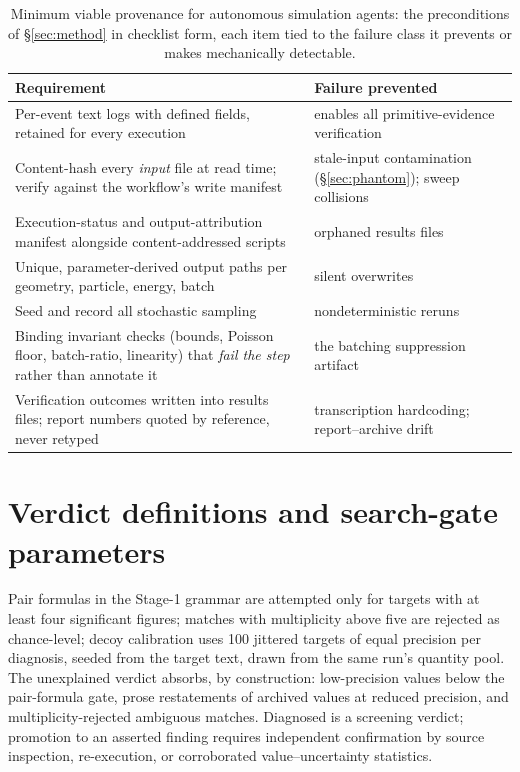 \documentclass{article}
\begin{document}
\begin{table}[H]
\centering
\small
\caption{Minimum viable provenance for autonomous simulation agents: the preconditions of \S\ref{sec:method} in checklist form, each item tied to the failure class it prevents or makes mechanically detectable.}
\label{tab:checklist}
\begin{tabular}{p{}p{}}
\toprule
Requirement & Failure prevented \\
\midrule
Per-event text logs with defined fields, retained for every execution & enables all primitive-evidence verification \\
Content-hash every \emph{input} file at read time; verify against the workflow's write manifest & stale-input contamination (\S\ref{sec:phantom}); sweep collisions \\
Execution-status and output-attribution manifest alongside content-addressed scripts & orphaned results files \\
Unique, parameter-derived output paths per geometry, particle, energy, batch & silent overwrites \\
Seed and record all stochastic sampling & nondeterministic reruns \\
Binding invariant checks (bounds, Poisson floor, batch-ratio, linearity) that \emph{fail the step} rather than annotate it & the batching suppression artifact \\
Verification outcomes written into results files; report numbers quoted by reference, never retyped & transcription hardcoding; report--archive drift \\
\bottomrule
\end{tabular}
\end{table}

\section{Verdict definitions and search-gate parameters}
\label{app:gates}
Pair formulas in the Stage-1 grammar are attempted only for targets with at least four significant figures; matches with multiplicity above five are rejected as chance-level; decoy calibration uses 100 jittered targets of equal precision per diagnosis, seeded from the target text, drawn from the same run's quantity pool. The unexplained verdict absorbs, by construction: low-precision values below the pair-formula gate, prose restatements of archived values at reduced precision, and multiplicity-rejected ambiguous matches. Diagnosed is a screening verdict; promotion to an asserted finding requires independent confirmation by source inspection, re-execution, or corroborated value--uncertainty statistics.
\end{document}
